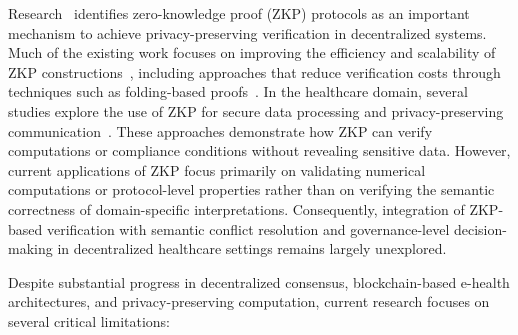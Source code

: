 \documentclass[journal]{IEEEtran}
\begin{document}
Research~\cite{Lavin2024} identifies zero-knowledge proof (ZKP) protocols as an important mechanism to achieve privacy-preserving verification in decentralized systems. Much of the existing work focuses on improving the efficiency and scalability of ZKP constructions~\cite{xie2023advances}, including approaches that reduce verification costs through techniques such as folding-based proofs~\cite{sakwa5293078survey}. In the healthcare domain, several studies explore the use of ZKP for secure data processing and privacy-preserving communication~\cite{babu2024secure,9387630}. These approaches demonstrate how ZKP can verify computations or compliance conditions without revealing sensitive data. However, current applications of ZKP focus primarily on validating numerical computations or protocol-level properties rather than on verifying the semantic correctness of domain-specific interpretations. Consequently, integration of ZKP-based verification with semantic conflict resolution and governance-level decision-making in decentralized healthcare settings remains largely unexplored.

Despite substantial progress in decentralized consensus, blockchain-based e-health architectures, and privacy-preserving computation, current research focuses on several critical limitations:
\end{document}
